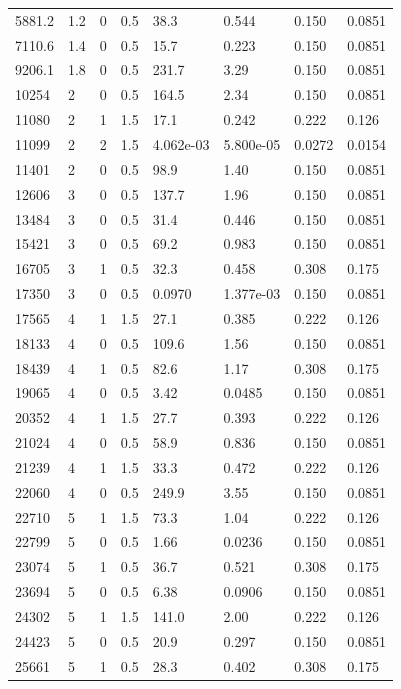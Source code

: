 \documentclass[preview]{standalone}
\begin{document}
{{\begin{tabular}{L{1.2cm}C{1.2cm} C{0.3cm}C{0.5cm} C{1.4cm}C{1.4cm} C{1.4cm}C{1.4cm}}
  5881.2  &   1.2  & 0     & 0.5 &  38.3  & 0.544  & 0.150 &  0.0851   \\ 
  7110.6  &   1.4  & 0     & 0.5 &  15.7  & 0.223  & 0.150 &  0.0851   \\ 
  9206.1  &   1.8  & 0     & 0.5 &  231.7  & 3.29  & 0.150 &  0.0851   \\ 
  10254  &     2  & 0     & 0.5 &  164.5  & 2.34  & 0.150 &  0.0851   \\ 
  11080  &     2  & 1     & 1.5 &  17.1  & 0.242  & 0.222 &  0.126   \\ 
  11099  &     2  & 2     & 1.5 &  4.062e-03  & 5.800e-05  & 0.0272 &  0.0154   \\ 
  11401  &     2  & 0     & 0.5 &  98.9  & 1.40  & 0.150 &  0.0851   \\ 
  12606  &     3  & 0     & 0.5 &  137.7  & 1.96  & 0.150 &  0.0851   \\ 
  13484  &     3  & 0     & 0.5 &  31.4  & 0.446  & 0.150 &  0.0851   \\ 
  15421  &     3  & 0     & 0.5 &  69.2  & 0.983  & 0.150 &  0.0851   \\ 
  16705  &     3  & 1     & 0.5 &  32.3  & 0.458  & 0.308 &  0.175   \\ 
  17350  &     3  & 0     & 0.5 &  0.0970  & 1.377e-03  & 0.150 &  0.0851   \\ 
  17565  &     4  & 1     & 1.5 &  27.1  & 0.385  & 0.222 &  0.126   \\ 
  18133  &     4  & 0     & 0.5 &  109.6  & 1.56  & 0.150 &  0.0851   \\ 
  18439  &     4  & 1     & 0.5 &  82.6  & 1.17  & 0.308 &  0.175   \\ 
  19065  &     4  & 0     & 0.5 &  3.42  & 0.0485  & 0.150 &  0.0851   \\ 
  20352  &     4  & 1     & 1.5 &  27.7  & 0.393  & 0.222 &  0.126   \\ 
  21024  &     4  & 0     & 0.5 &  58.9  & 0.836  & 0.150 &  0.0851   \\ 
  21239  &     4  & 1     & 1.5 &  33.3  & 0.472  & 0.222 &  0.126   \\ 
  22060  &     4  & 0     & 0.5 &  249.9  & 3.55  & 0.150 &  0.0851   \\ 
  22710  &     5  & 1     & 1.5 &  73.3  & 1.04  & 0.222 &  0.126   \\ 
  22799  &     5  & 0     & 0.5 &  1.66  & 0.0236  & 0.150 &  0.0851   \\ 
  23074  &     5  & 1     & 0.5 &  36.7  & 0.521  & 0.308 &  0.175   \\ 
  23694  &     5  & 0     & 0.5 &  6.38  & 0.0906  & 0.150 &  0.0851   \\ 
  24302  &     5  & 1     & 1.5 &  141.0  & 2.00  & 0.222 &  0.126   \\ 
  24423  &     5  & 0     & 0.5 &  20.9  & 0.297  & 0.150 &  0.0851   \\ 
  25661  &     5  & 1     & 0.5 &  28.3  & 0.402  & 0.308 &  0.175   \\ 
\hline 
\end{tabular} 

}}
\end{document}
